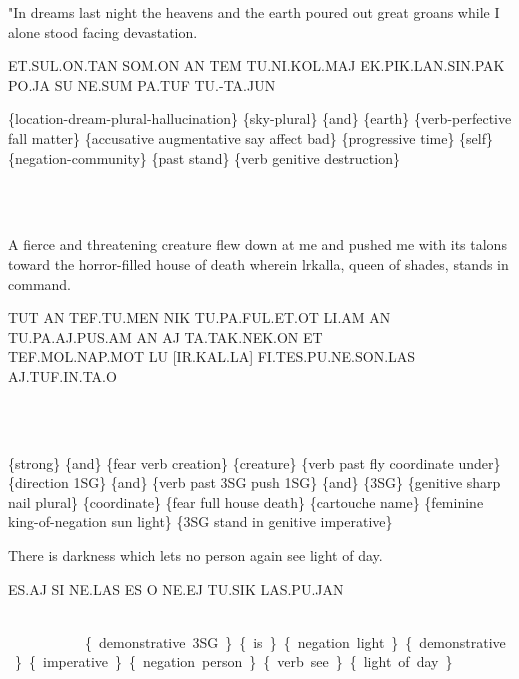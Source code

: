 {\drie 
 

"In dreams last night the heavens and the earth poured out great groans while I alone stood facing devastation.  

ET.SUL.ON.TAN SOM.ON AN TEM TU.NI.KOL.MAJ EK.PIK.LAN.SIN.PAK PO.JA SU NE.SUM PA.TUF TU.-TA.JUN 

\{location-dream-plural-hallucination\} \{sky-plural\} \{and\} \{earth\} \{verb-perfective fall matter\} \{accusative augmentative say affect bad\} \{progressive time\} \{self\} \{negation-community\} \{past stand\} \{verb genitive destruction\} 

 
\et\sul\on\Atlantan\som\on~\an~\tem~\tu\Atlanni\kol\maj~\ek\pik\lan\Atlansin\pak \\ ~\po\ja \su \Atlanne\Atlansum~\pa\tuf~\tu\ta\jun 
 
\drie 

A fierce and threatening creature flew down at me and pushed me with its talons toward the horror-filled house of death wherein lrkalla, queen of shades, stands in command.  

TUT AN TEF.TU.MEN NIK TU.PA.FUL.ET.OT LI.AM AN TU.PA.AJ.PUS.AM AN AJ TA.TAK.NEK.ON ET \\TEF.MOL.NAP.MOT LU [IR.KAL.LA] FI.TES.PU.NE.SON.LAS \\AJ.TUF.IN.TA.O 

\tut ~ \an ~ \tef\tu\men ~ \nik ~ \tu\pa\ful\et\ot ~ \li\am ~ \an ~ \tu\pa\aj\pus\am ~ \an ~ \\ \aj ~ \ta\tak\nek\on ~ \et ~ \tef\mol\nap\mot ~ \lu ~ \cartouche{\il\kal\la} ~ \Atlanfi\tes\pu\Atlanne\son\las ~ \aj\tuf\Atlanin\ta\Atlano

\{strong\} \{and\} \{fear verb creation\} \{creature\} \{verb past fly coordinate under\} \{direction 1SG\} \{and\} \{verb past 3SG push 1SG\} \{and\} \{3SG\} \{genitive sharp nail plural\} \{coordinate\} \{fear full house death\} \{cartouche name\} \{feminine king-of-negation sun light\} \{3SG stand in genitive imperative\} 

 
 

There is darkness which lets no person again see light of day.  

 ES.AJ SI NE.LAS ES O NE.EJ TU.SIK LAS.PU.JAN 

\es\aj ~ \si ~ \Atlanne\la ~ \es ~ \Atlano ~ \Atlanne\ej ~ \tu\sik ~ \las\pu\jan

 \{demonstrative 3SG\} \{is\} \{negation light\} \{demonstrative\} \{imperative\} \{negation person\} \{verb see\} \{light of day\} 

}
